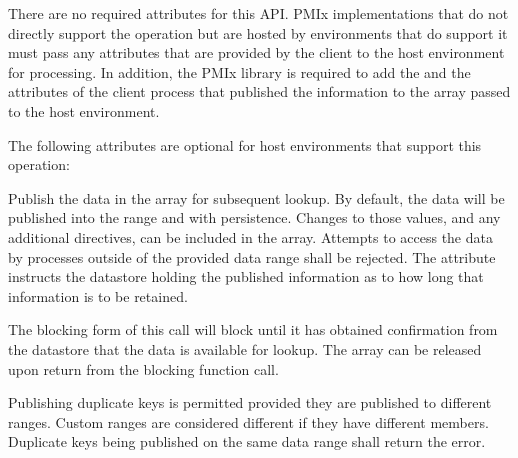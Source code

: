 \begin{arglist}
\end{arglist}
%
\returnsimple
%
\reqattrstart
There are no required attributes for this \ac{API}. \ac{PMIx} implementations that do not directly support the operation but are hosted by environments that do support it must pass any attributes that are provided by the client to the host environment for processing. In addition, the \ac{PMIx} library is required to add the  and the  attributes of the client process that published the information to the  array passed to the host environment.
\reqattrend

\optattrstart
The following attributes are optional for host environments that support this operation:


\optattrend

\descr

Publish the data in the  array for subsequent lookup.
By default, the data will be published into the  range and with  persistence.
Changes to those values, and any additional directives, can be included in the  array. Attempts to access the data by processes outside of the provided data range shall be rejected. The  attribute instructs the datastore holding the published information as to how long that information is to be retained.

The blocking form of this call will block until it has obtained confirmation from the datastore that the data is available for lookup. The  array can be released upon return from the blocking function call.

Publishing duplicate keys is permitted provided they are published to different
ranges. Custom ranges are considered different if they have different members.
Duplicate keys being published on the same data range shall return the
 error.

